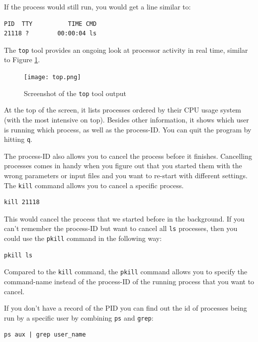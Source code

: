 \documentclass[11pt]{article}
\begin{document}
If the process would still run, you would
get a line similar to:

\begin{verbatim}
PID  TTY          TIME CMD
21118 ?        00:00:04 ls
\end{verbatim}

The \texttt{top} tool provides an ongoing look at processor activity in real
time, similar to Figure \ref{fig:top}.


\begin{figure}[htb]
\centering
\texttt{[image: top.png]}
\caption{\label{fig:top}Screenshot of the \texttt{top} tool output}
\end{figure}

At the top of the screen, it lists processes ordered by their CPU usage
system (with the most intensive on top). Besides other information, it shows which user is running
which process, as well as the process-ID. You can quit the program by
hitting \texttt{q}.

The process-ID also allows you to cancel the process before it
finishes. Cancelling processes comes in handy when you figure out
that you started them with the wrong parameters or input files and you want
to re-start with different settings. The \texttt{kill} command allows you
to cancel a specific process.

\begin{verbatim}
kill 21118
\end{verbatim}

This would cancel the process that we started before in the
background. If you can't remember the process-ID but want to cancel
all \texttt{ls} processes, then you could use the \texttt{pkill} command in the
following way:

\begin{verbatim}
pkill ls
\end{verbatim}

Compared to the \texttt{kill} command, the \texttt{pkill} command allows you to
specify the command-name instead of the process-ID of the running
process that you want to cancel.

If you don't have a record of the PID you can find out the id of processes being run by a specific user
by combining \texttt{ps} and \texttt{grep}:

\begin{verbatim}
ps aux | grep user_name
\end{verbatim}
\end{document}
